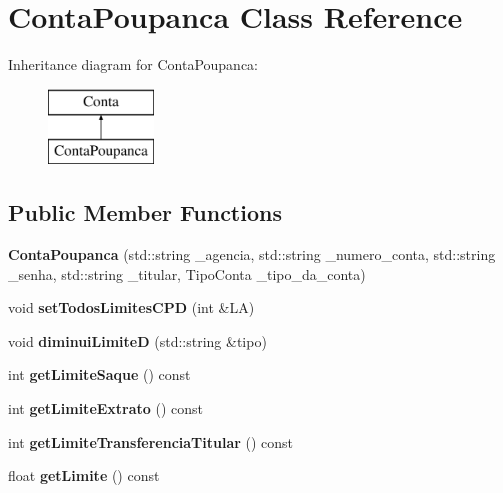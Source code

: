 \hypertarget{classContaPoupanca}{}\section{Conta\+Poupanca Class Reference}
\label{classContaPoupanca}
Inheritance diagram for Conta\+Poupanca\+:\begin{figure}[H]
\begin{center}
\leavevmode
\includegraphics[height=2.000000cm]{classContaPoupanca}
\end{center}
\end{figure}
\subsection*{Public Member Functions}
\begin{DoxyCompactItemize}
\item 
\mbox{\label{classContaPoupanca_a80d4955cdfe5d9ab14fe067ef2e92236}} 
{\bfseries Conta\+Poupanca} (std\+::string \+\_\+agencia, std\+::string \+\_\+numero\+\_\+conta, std\+::string \+\_\+senha, std\+::string \+\_\+titular, Tipo\+Conta \+\_\+tipo\+\_\+da\+\_\+conta)
\item 
\mbox{\label{classContaPoupanca_a33a69fa8c291ba8509fd643c0a55445c}} 
void {\bfseries set\+Todos\+Limites\+C\+PD} (int \&LA)
\item 
\mbox{\label{classContaPoupanca_aa56dd906d9b47915b65038b0968d0289}} 
void {\bfseries diminui\+LimiteD} (std\+::string \&tipo)
\item 
\mbox{\label{classContaPoupanca_a8ec6d2bf7c6304ca896b032603dedc6a}} 
int {\bfseries get\+Limite\+Saque} () const
\item 
\mbox{\label{classContaPoupanca_a273c0e693efe41ccb44e1acbf1ce6728}} 
int {\bfseries get\+Limite\+Extrato} () const
\item 
\mbox{\label{classContaPoupanca_a0c4ba4e299a936ba30bf3bdad0fe199b}} 
int {\bfseries get\+Limite\+Transferencia\+Titular} () const
\item 
\mbox{\label{classContaPoupanca_a53c74e9136c70e1c015d3cec18c3ed9c}} 
float {\bfseries get\+Limite} () const
\end{DoxyCompactItemize}
